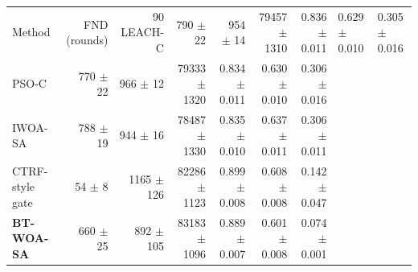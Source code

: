 \begin{tabular}{lrrrrrr}
\toprule
Method & FND (rounds) & 90 %
\midrule
LEACH-C & 790 $\pm$ 22 & 954 $\pm$ 14 & 79457 $\pm$ 1310 & 0.836 $\pm$ 0.011 & 0.629 $\pm$ 0.010 & 0.305 $\pm$ 0.016 \\
PSO-C & 770 $\pm$ 22 & 966 $\pm$ 12 & 79333 $\pm$ 1320 & 0.834 $\pm$ 0.011 & 0.630 $\pm$ 0.010 & 0.306 $\pm$ 0.016 \\
IWOA-SA & 788 $\pm$ 19 & 944 $\pm$ 16 & 78487 $\pm$ 1330 & 0.835 $\pm$ 0.010 & 0.637 $\pm$ 0.011 & 0.306 $\pm$ 0.011 \\
CTRF-style gate & 54 $\pm$ 8 & 1165 $\pm$ 126 & 82286 $\pm$ 1123 & 0.899 $\pm$ 0.008 & 0.608 $\pm$ 0.008 & 0.142 $\pm$ 0.047 \\
\textbf{BT-WOA-SA} & 660 $\pm$ 25 & 892 $\pm$ 105 & 83183 $\pm$ 1096 & 0.889 $\pm$ 0.007 & 0.601 $\pm$ 0.008 & 0.074 $\pm$ 0.001 \\
\bottomrule
\end{tabular}